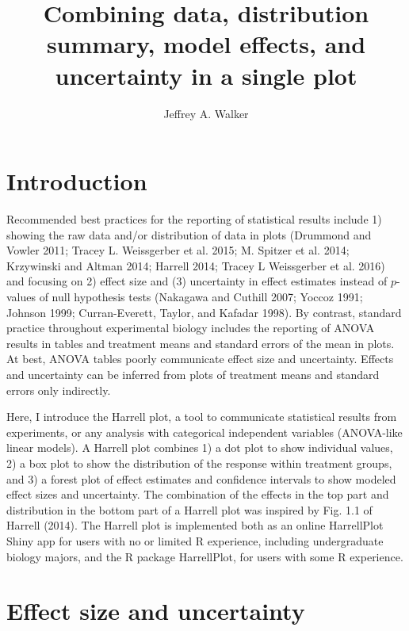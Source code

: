 \documentclass[fleqn,10pt,lineno]{wlpeerj} %
\title{Combining data, distribution summary, model effects, and uncertainty in
a single plot}
\author[\href{mailto:walker@maine.edu}{\nolinkurl{walker@maine.edu}}]{Jeffrey A. Walker}
\theoremstyle{definition}
\theoremstyle{definition}
\theoremstyle{definition}
\theoremstyle{remark}
\begin{document}
\flushbottom
\maketitle
\thispagestyle{empty}

\section*{Introduction}\label{introduction}

Recommended best practices for the reporting of statistical results
include 1) showing the raw data and/or distribution of data in plots
(Drummond and Vowler 2011; Tracey L. Weissgerber et al. 2015; M. Spitzer
et al. 2014; Krzywinski and Altman 2014; Harrell 2014; Tracey L
Weissgerber et al. 2016) and focusing on 2) effect size and (3)
uncertainty in effect estimates instead of \(p\)-values of null
hypothesis tests (Nakagawa and Cuthill 2007; Yoccoz 1991; Johnson 1999;
Curran-Everett, Taylor, and Kafadar 1998). By contrast, standard
practice throughout experimental biology includes the reporting of ANOVA
results in tables and treatment means and standard errors of the mean in
plots. At best, ANOVA tables poorly communicate effect size and
uncertainty. Effects and uncertainty can be inferred from plots of
treatment means and standard errors only indirectly.

Here, I introduce the Harrell plot, a tool to communicate statistical
results from experiments, or any analysis with categorical independent
variables (ANOVA-like linear models). A Harrell plot combines 1) a dot
plot to show individual values, 2) a box plot to show the distribution
of the response within treatment groups, and 3) a forest plot of effect
estimates and confidence intervals to show modeled effect sizes and
uncertainty. The combination of the effects in the top part and
distribution in the bottom part of a Harrell plot was inspired by Fig.
1.1 of Harrell (2014). The Harrell plot is implemented both as an online
HarrellPlot Shiny app for users with no or limited R experience,
including undergraduate biology majors, and the R package HarrellPlot,
for users with some R experience.

\section*{Effect size and
uncertainty}\label{effect-size-and-uncertainty}
\end{document}
